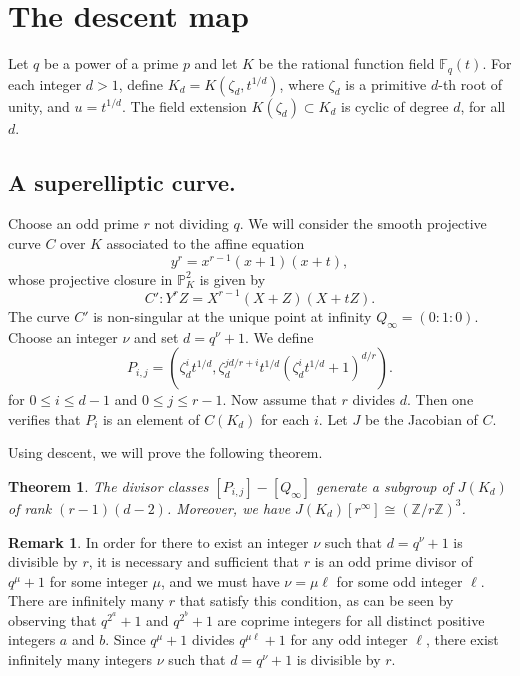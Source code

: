 \documentclass[reqno]{amsart}
\newtheorem{theorem}{Theorem}[section]
\theoremstyle{definition}
\newtheorem{remark}[thm]{Remark}
\theoremstyle{remark}
\def\p{\mathbb{P}}
\def\Z{\mathbb{Z}}
\def\F{\mathbb{F}}
\begin{document}
\section{The descent map}

Let $q$ be a power of a prime $p$ and let $K$ be the rational function field $\F_q(t)$. For each integer $d>1$, define $K_d = K(\zeta_d,t^{1/d})$, where $\zeta_d$ is a primitive $d$-th root of unity, and $u = t^{1/d}$. The field extension $K(\zeta_d) \subset K_d$ is cyclic of degree $d$, for all $d$.

\subsection{A superelliptic curve.}

Choose an odd prime $r$ not dividing $q$. We will consider the smooth projective curve $C$ over $K$ associated to the affine equation
\begin{equation}
\label{equationOfC}
y^r = x^{r-1}(x+1)(x+t),
\end{equation}
whose projective closure in $\p^2_K$ is given by
$$
C' : Y^rZ = X^{r-1}(X+Z)(X+tZ).
$$
The curve $C'$ is non-singular at the unique point at infinity $Q_{\infty} = (0:1:0)$. Choose an integer $\nu$ and set $d = q^\nu+1$. We define
$$
P_{i,j} = \left( \zeta_d^i t^{1/d}, \zeta_d^{jd/r+i} t^{1/d} ( \zeta_d^i t^{1/d}+1 )^{d/r}  \right).
$$ 
for $0 \leq i \leq d-1$ and $0 \leq j \leq r-1$. Now assume that $r$ divides $d$. Then one verifies that $P_i$ is an element of $C(K_d)$ for each $i$. Let $J$ be the Jacobian of $C$.

Using descent, we will prove the following theorem.

\begin{theorem}
\label{subgoal}
The divisor classes $[P_{i,j}] - [Q_{\infty}]$ generate a subgroup of $J(K_d)$ of rank $(r-1)(d-2)$. Moreover, we have $J(K_d)[r^{\infty}] \cong (\Z/r\Z)^3$.
\end{theorem}

\begin{remark}
\upshape
In order for there to exist an integer $\nu$ such that $d = q^\nu+1$ is divisible by $r$, it is necessary and sufficient that $r$ is an odd prime divisor of $q^{\mu}+1$ for some integer $\mu$, and we must have $\nu = \mu \ell$ for some odd integer $\ell$. There are infinitely many $r$ that satisfy this condition, as can be seen by observing that $q^{2^a}+1$ and $q^{2^b}+1$ are coprime integers for all distinct positive integers $a$ and $b$. Since $q^\mu + 1$ divides $q^{\mu \ell}+1$ for any odd integer $\ell$, there exist infinitely many integers $\nu$ such that $d = q^\nu+1$ is divisible by $r$.
\end{remark}
\end{document}
